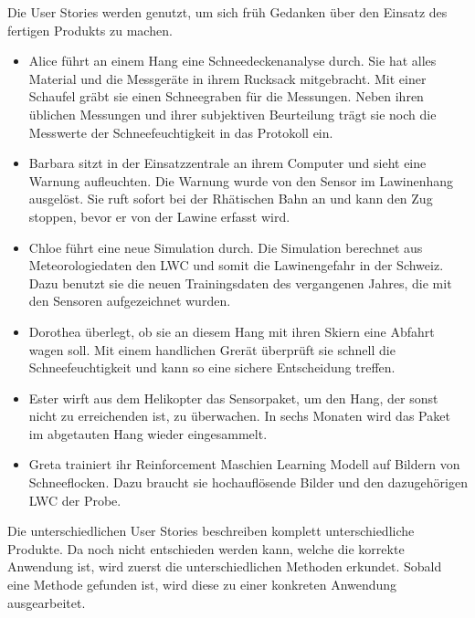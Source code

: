 

Die User Stories werden genutzt, um sich früh Gedanken über den Einsatz des fertigen Produkts zu machen.

\begin{itemize}

\item Alice führt an einem Hang eine Schneedeckenanalyse durch. Sie hat alles Material und die Messgeräte in ihrem Rucksack mitgebracht. Mit einer Schaufel gräbt sie einen Schneegraben für die Messungen. Neben ihren üblichen Messungen und ihrer subjektiven Beurteilung trägt sie noch die Messwerte der Schneefeuchtigkeit in das Protokoll ein.

\item Barbara sitzt in der Einsatzzentrale an ihrem Computer und sieht eine Warnung aufleuchten. Die Warnung wurde von den Sensor im Lawinenhang ausgelöst. Sie ruft sofort bei der Rhätischen Bahn an und kann den Zug stoppen, bevor er von der Lawine erfasst wird.

\item Chloe führt eine neue Simulation durch. Die Simulation berechnet aus Meteorologiedaten den LWC und somit die Lawinengefahr in der Schweiz. Dazu benutzt sie die neuen Trainingsdaten des vergangenen Jahres, die mit den Sensoren aufgezeichnet wurden.

\item Dorothea überlegt, ob sie an diesem Hang mit ihren Skiern eine Abfahrt wagen soll. Mit einem handlichen Grerät überprüft sie schnell die Schneefeuchtigkeit und kann so eine sichere Entscheidung treffen.

\item Ester wirft aus dem Helikopter das Sensorpaket, um den Hang, der sonst nicht zu erreichenden ist, zu überwachen. In sechs Monaten wird das Paket im abgetauten Hang wieder eingesammelt.

\item Greta trainiert ihr Reinforcement Maschien Learning Modell auf Bildern von Schneeflocken. Dazu braucht sie hochauflösende Bilder und den dazugehörigen LWC der Probe.

\end{itemize}

Die unterschiedlichen User Stories beschreiben komplett unterschiedliche Produkte. Da noch nicht entschieden werden kann, welche die korrekte Anwendung ist, wird zuerst die unterschiedlichen Methoden erkundet. Sobald eine Methode gefunden ist, wird diese zu einer konkreten Anwendung ausgearbeitet.

